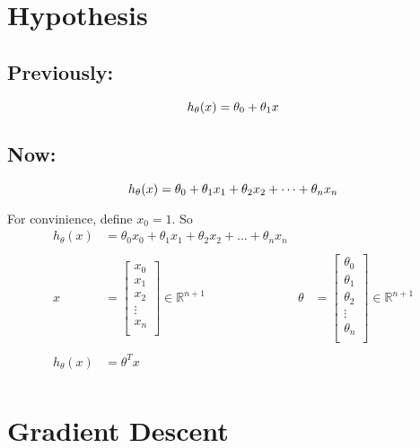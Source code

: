 \documentclass[a4paper, 12pt]{report}
\def\R{\mathbb{R}}
\begin{document}
\section{Hypothesis}
\subsection*{Previously:}
\begin{equation*}
	h_\theta(x) = \theta_0 + \theta_1x\\
\end{equation*}
\subsection*{Now:}
\begin{equation*}
	h_\theta(x) = \theta_0	+ \theta_1x_1 + \theta_2x_2 + \dots + \theta_nx_n\\
\end{equation*}

For convinience, define $x_0 = 1$. So
\begin{align*}
	h_\theta(x) & = \theta_0x_0	+ \theta_1x_1 + \theta_2x_2 + \dots + \theta_nx_n   \\
	\\
	x           & = \begin{bmatrix}
		x_0    \\
		x_1    \\
		x_2    \\
		\vdots \\
		x_n    \\
	\end{bmatrix} \in \R^{n+1}                      &
	\theta      & = \begin{bmatrix}
		\theta_0 \\
		\theta_1 \\
		\theta_2 \\
		\vdots   \\
		\theta_n \\
	\end{bmatrix} \in \R^{n+1}                        \\
	\\
	h_\theta(x) & = \theta^Tx                                                      \\
\end{align*}

\section{Gradient Descent}
\end{document}
